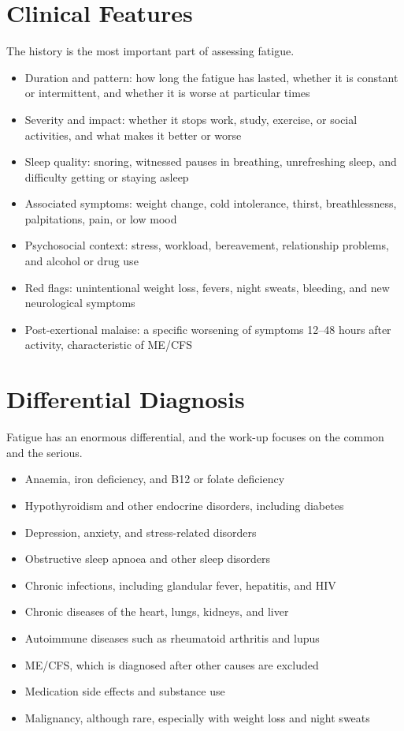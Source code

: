 \section*{Clinical Features}
The history is the most important part of assessing fatigue.
\begin{itemize}
    \item Duration and pattern: how long the fatigue has lasted, whether it is constant or intermittent, and whether it is worse at particular times
    \item Severity and impact: whether it stops work, study, exercise, or social activities, and what makes it better or worse
    \item Sleep quality: snoring, witnessed pauses in breathing, unrefreshing sleep, and difficulty getting or staying asleep
    \item Associated symptoms: weight change, cold intolerance, thirst, breathlessness, palpitations, pain, or low mood
    \item Psychosocial context: stress, workload, bereavement, relationship problems, and alcohol or drug use
    \item Red flags: unintentional weight loss, fevers, night sweats, bleeding, and new neurological symptoms
    \item Post-exertional malaise: a specific worsening of symptoms 12--48 hours after activity, characteristic of ME/CFS
\end{itemize}

\section*{Differential Diagnosis}
Fatigue has an enormous differential, and the work-up focuses on the common and the serious.
\begin{itemize}
    \item Anaemia, iron deficiency, and B12 or folate deficiency
    \item Hypothyroidism and other endocrine disorders, including diabetes
    \item Depression, anxiety, and stress-related disorders
    \item Obstructive sleep apnoea and other sleep disorders
    \item Chronic infections, including glandular fever, hepatitis, and HIV
    \item Chronic diseases of the heart, lungs, kidneys, and liver
    \item Autoimmune diseases such as rheumatoid arthritis and lupus
    \item ME/CFS, which is diagnosed after other causes are excluded
    \item Medication side effects and substance use
    \item Malignancy, although rare, especially with weight loss and night sweats
\end{itemize}

